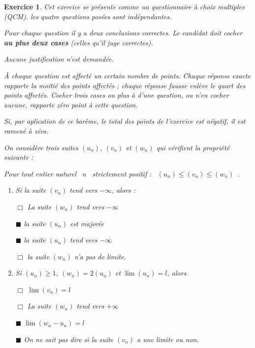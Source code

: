 \documentclass[12pt,a4paper,french]{article}
\theoremstyle{break}
\newtheorem{exercice}{Exercice}
\theoremstyle{nonumberplain}
\theoremstyle{nonumberbreak}
\begin{document}
\begin{exercice}
  Cet exercice se présente comme un questionnaire à choix multiples
  (QCM). les quatre questions posées sont indépendantes.

  Pour chaque question il y a deux conclusions correctes. Le candidat
  doit cocher \textbf{au plus deux cases} (celles qu'il juge correctes).

  Aucune justification n'est demandée.

  À chaque question est affecté  un certain nombre de points. Chaque
  réponse exacte rapporte la moitié des  points affectés ; chaque
  réponse fausse enlève le quart des points affectés. Cocher trois cases
  ou plus à d'une question, ou n'en cocher aucune, rapporte zéro point à
  cette question.

  Si, par aplication de ce barème, le total des points de l'exercice est
  négatif, il est ramené à zéro.


  On considère trois suites $\left(u_{n}\right),~ \left(v_{n}\right)$ et
  $\left(w_{n}\right)$ qui vérifient la propriété suivante :

  \begin{center}
    \og Pour tout entier naturel~ $n$~ strictement positif :~
    $\left(u_{n}\right) \leqslant \left(v_{n}\right) \leqslant
    \left(w_{n}\right)$~\fg.
\end{center}

  \begin{enumerate}
    \item Si la suite $\left(v_{n}\right)$ tend vers $- \infty$, alors :

      $\Box$ La suite $\left(w_{n}\right)$ tend vers $- \infty$

      $\blacksquare$ la suite $\left(u_{n}\right)$ est majorée

      $\blacksquare$ la suite $\left(u_{n}\right)$ tend vers $- \infty$

      $\Box$ la suite $\left(w_{n}\right)$ n'a pas de limite.

    \item Si $\left(u_{n}\right) \geqslant 1,~\left(w_{n}\right) =
      2\left(u_{n}\right)$ et $\lim \left(u_{n}\right) = l$, alors

      $\Box$ $\lim  \left(v_{n}\right) = l$

      $\Box$ La suite $\left(w_{n}\right)$ tend vers $+ \infty$

      $\blacksquare$ $\lim (w_{n} - u_{n})= l$

      $\blacksquare$ On ne sait pas dire si la suite $\left(v_{n}\right)$ a une
      limite ou non.


\end{enumerate}
\end{exercice}
\end{document}
